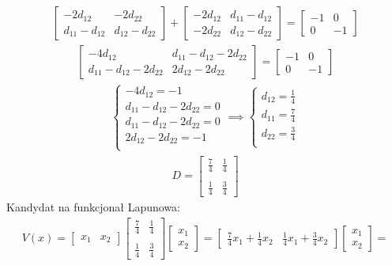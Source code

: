 \documentclass[a4paper,11pt]{article}
\begin{document}
\begin{align*}
\begin{bmatrix}
-2d_{12} & -2d_{22} \\
d_{11}-d_{12} & d_{12}-d_{22}
\end{bmatrix} +
\begin{bmatrix}
-2d_{12} & d_{11}-d_{12} \\
-2d_{22} & d_{12}-d_{22}
\end{bmatrix} = 
\begin{bmatrix}
-1 & 0 \\
0 & -1
\end{bmatrix} 
\end{align*}
\begin{align*}
\begin{bmatrix}
-4d_{12} & d_{11}-d_{12}-2d_{22} \\
d_{11}-d_{12}-2d_{22} & 2d_{12}-2d_{22}
\end{bmatrix} =
\begin{bmatrix}
-1 & 0 \\
0 & -1
\end{bmatrix} 
\end{align*}
\begin{align*}
\begin{cases}
-4d_{12} = -1  \\
d_{11}-d_{12}-2d_{22} = 0 \\
d_{11}-d_{12}-2d_{22} = 0 \\
2d_{12}-2d_{22} = -1 \\
\end{cases}
\implies
\begin{cases}
d_{12} = \frac{1}{4}  \\
d_{11} = \frac{7}{4} \\
d_{22} = \frac{3}{4} \\
\end{cases}
\end{align*}
\begin{align*}
D = 
\begin{bmatrix}
\frac{7}{4} & \frac{1}{4} \\ \\
\frac{1}{4} & \frac{3}{4}
\end{bmatrix}
\end{align*}
Kandydat na funkcjonał Lapunowa:
\begin{align*}
V(x) = 
\begin{bmatrix}
x_{1} & x_{2}
\end{bmatrix}
\begin{bmatrix}
\frac{7}{4} & \frac{1}{4} \\ \\
\frac{1}{4} & \frac{3}{4}
\end{bmatrix}
\begin{bmatrix}
x_{1} \\
x_{2}
\end{bmatrix} = 
\begin{bmatrix}
\frac{7}{4}x_{1}+\frac{1}{4}x_{2} & \frac{1}{4}x_{1}+\frac{3}{4}x_{2}
\end{bmatrix}
\begin{bmatrix}
x_{1} \\
x_{2}
\end{bmatrix} = 
\end{align*}
\end{document}
